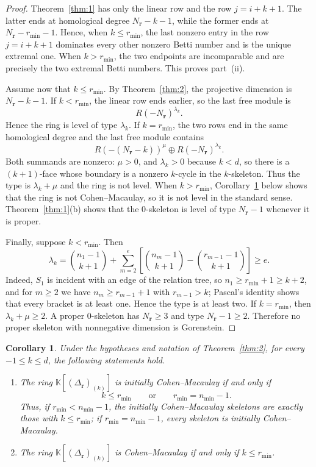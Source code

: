 \documentclass[11pt]{amsart}
\newtheorem{corollary}[theorem]{Corollary}
\theoremstyle{definition}
\theoremstyle{remark}
\newcommand{\K}{\mathbb K}
\newcommand{\SR}[1]{\K[#1]}
\begin{document}
\begin{proof}
		Theorem~\ref{thm:1} has only the linear row and the row $j=i+k+1$. The latter ends at homological degree $N_{\mathbf r}-k-1$, while the former ends at $N_{\mathbf r}-r_{\min}-1$. Hence, when $k\le r_{\min}$, the last nonzero entry in the row $j=i+k+1$ dominates every other nonzero Betti number and is the unique extremal one. When $k>r_{\min}$, the two endpoints are incomparable and are precisely the two extremal Betti numbers. This proves part~(ii).
		
		Assume now that $k\le r_{\min}$. By Theorem~\ref{thm:2}, the projective dimension is $N_{\mathbf r}-k-1$. If $k<r_{\min}$, the linear row ends earlier, so the last free module is
		\[
		R(-N_{\mathbf r})^{\lambda_k}.
		\]
		Hence the ring is level of type $\lambda_k$. If $k=r_{\min}$, the two rows end in the same homological degree and the last free module contains
		\[
		R(-(N_{\mathbf r}-k))^{\mu}\oplus R(-N_{\mathbf r})^{\lambda_k}.
		\]
		Both summands are nonzero: $\mu>0$, and $\lambda_k>0$ because $k<d$, so there is a $(k+1)$-face whose boundary is a nonzero $k$-cycle in the $k$-skeleton. Thus the type is $\lambda_k+\mu$ and the ring is not level. When $k>r_{\min}$, Corollary~\ref{cor:3} below shows that the ring is not Cohen--Macaulay, so it is not level in the standard sense. Theorem~\ref{thm:1}(b) shows that the $0$-skeleton is level of type $N_{\mathbf r}-1$ whenever it is proper.
		
		Finally, suppose $k<r_{\min}$. Then
		\[
		\lambda_k=
		\binom{n_1-1}{k+1}
		+\sum_{m=2}^{e}
		\left[
		\binom{n_m-1}{k+1}
		-
		\binom{r_{m-1}-1}{k+1}
		\right]\ge e.
		\]
		Indeed, $S_1$ is incident with an edge of the relation tree, so $n_1\ge r_{\min}+1\ge k+2$, and for $m\ge2$ we have $n_m\ge r_{m-1}+1$ with $r_{m-1}>k$; Pascal's identity shows that every bracket is at least one. Hence the type is at least two. If $k=r_{\min}$, then $\lambda_k+\mu\ge2$. A proper $0$-skeleton has $N_{\mathbf r}\ge3$ and type $N_{\mathbf r}-1\ge2$. Therefore no proper skeleton with nonnegative dimension is Gorenstein.
	\end{proof}
	
	\begin{corollary}\label{cor:3}
		Under the hypotheses and notation of Theorem~\ref{thm:2}, for every $-1\le k\le d$, the following statements hold.
		\begin{enumerate}
			\item[(i)] The ring $\SR{(\Delta_{\mathbf r})_{(k)}}$ is initially Cohen--Macaulay if and only if
			\[
			k\le r_{\min}
			\qquad\text{or}\qquad
			r_{\min}=n_{\min}-1.
			\]
			Thus, if $r_{\min}<n_{\min}-1$, the initially Cohen--Macaulay skeletons are exactly those with $k\le r_{\min}$; if $r_{\min}=n_{\min}-1$, every skeleton is initially Cohen--Macaulay.
			
			\item[(ii)] The ring $\SR{(\Delta_{\mathbf r})_{(k)}}$ is Cohen--Macaulay if and only if $k\le r_{\min}$.
		\end{enumerate}
	\end{corollary}
	
\end{document}
